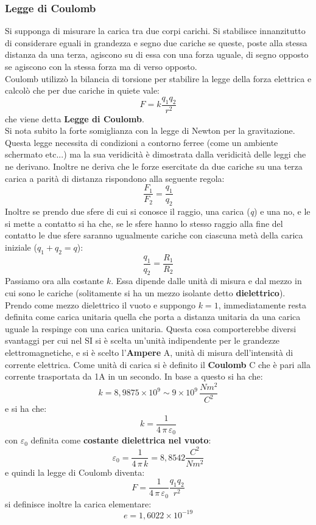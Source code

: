 \documentclass[a4paper,12pt, oneside]{book}
\begin{document}
\subsubsection{Legge di Coulomb}
Si supponga di misurare la carica tra due corpi carichi. Si stabilisce innanzitutto di considerare eguali in grandezza e segno due cariche se queste, poste alla stessa distanza da una terza, agiscono su di essa con una forza uguale, di segno opposto se agiscono con la stessa forza ma di verso opposto.\\
Coulomb utilizzò la bilancia di torsione per stabilire la legge della forza elettrica e calcolò che per due cariche in quiete vale:
$$F=k\frac{q_1q_2}{r^2}$$
che viene detta \textbf{Legge di Coulomb}.\\
Si nota subito la forte somiglianza con la legge di Newton per la gravitazione. Questa legge necessita di condizioni a contorno ferree (come un ambiente schermato etc...) ma la sua veridicità è dimostrata dalla veridicità delle leggi che ne derivano. Inoltre ne deriva che le forze esercitate da due cariche su una terza carica a parità di distanza rispondono alla seguente regola:
$$\frac{F_1}{F_2}=\frac{q_1}{q_2}$$
Inoltre se prendo due sfere di cui si conosce il raggio, una carica (\textit{q}) e una no, e le si mette a contatto si ha che, se le sfere hanno lo stesso raggio alla fine del contatto le due sfere saranno ugualmente cariche con ciascuna metà della carica iniziale ($q_1+q_2=q$):
$$\frac{q_1}{q_2}=\frac{R_1}{R_2}$$
Passiamo ora alla costante $k$. Essa dipende dalle unità di misura e dal mezzo in cui sono le cariche (solitamente si ha un mezzo isolante detto \textbf{dielettrico}). Prendo come mezzo dielettrico il vuoto e suppongo $k=1$, immediatamente resta definita come carica unitaria quella che porta a distanza unitaria da una carica uguale la respinge con una carica unitaria. Questa cosa comporterebbe diversi svantaggi per cui nel SI si è scelta un'unità indipendente per le grandezze elettromagnetiche, e si è scelto l'\textbf{Ampere} A, unità di misura dell'intensità di corrente elettrica. Come unità di carica si è definito il \textbf{Coulomb} C che è pari alla corrente trasportata da 1A in un secondo. In base a questo si ha che:
$$k=8,9875\times 10^9\sim 9\times 10^9\,\frac{Nm^2}{C^2}$$
e si ha che:
$$k=\frac{1}{4\,\pi\,\varepsilon_0}$$
con $\varepsilon_0$ definita come \textbf{costante dielettrica nel vuoto}:
$$\varepsilon_0=\frac{1}{4\,\pi\,k}=8,8542\frac{C^2}{Nm^2}$$
e quindi la legge di Coulomb diventa:
$$F=\frac{1}{4\,\pi\,\varepsilon_0}\frac{q_1q_2}{r^2}$$
si definisce inoltre la carica elementare:
$$e=1,6022\times 10^{-19}$$
\end{document}
